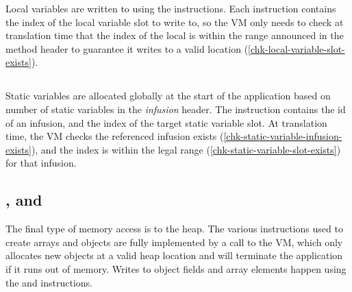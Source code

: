 Local variables are written to using the  instructions. Each  instruction contains the index of the local variable slot to write to, so the VM only needs to check at translation time that the index of the local is within the range announced in the method header to guarantee it writes to a valid location (\ref{chk-local-variable-slot-exists}).

\subsection{}
Static variables are allocated globally at the start of the application based on number of static variables in the \emph{infusion} header. The  instruction contains the id of an infusion, and the index of the target static variable slot. At translation time, the VM checks the referenced infusion exists (\ref{chk-static-variable-infusion-exists}), and the index is within the legal range (\ref{chk-static-variable-slot-exists}) for that infusion.

\subsection{,  and }
\label{sec-safety-heap-access}




The final type of memory access is to the heap. The various  instructions used to create arrays and objects are fully implemented by a call to the VM, which only allocates new objects at a valid heap location and will terminate the application if it runs out of memory. Writes to object fields and array elements happen using the  and  instructions.

